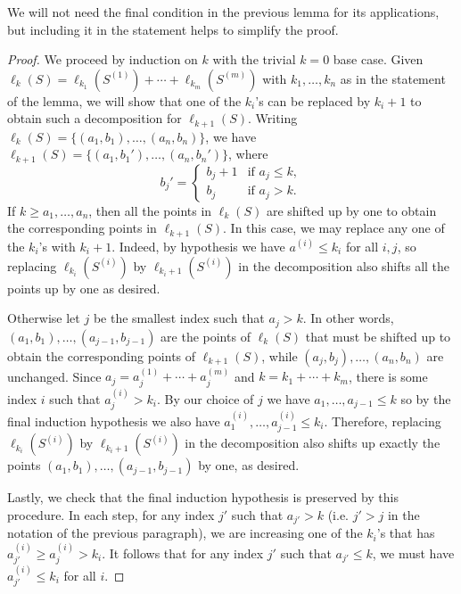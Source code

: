 \documentclass[12pt]{amsart}
\numberwithin{equation}{section}
\theoremstyle{definition}
\begin{document}
We will not need the final condition in the previous lemma for its applications, but including it in the statement helps to simplify the proof. 

\begin{proof}
    We proceed by induction on $k$ with the trivial $k=0$ base case. Given $\ell_k(S) = \ell_{k_1}(S^{(1)})+\cdots+\ell_{k_m}(S^{(m)})$ with $k_1,\dots,k_n$ as in the statement of the lemma, we will show that one of the $k_i$'s can be replaced by $k_i+1$ to obtain such a decomposition for $\ell_{k+1}(S)$. Writing $\ell_k(S) = \{(a_1,b_1),\dots,(a_n,b_n)\}$, we have $\ell_{k+1}(S) = \{(a_1,b_1'),\dots,(a_n,b_n')\}$, where
    \[ b_j' = \begin{cases}
        b_j+1 & \text{if } a_j\leq k,\\
        b_j & \text{if } a_j>k.
    \end{cases} \]
    If $k\geq a_1,\dots,a_n$, then all the points in $\ell_k(S)$ are shifted up by one to obtain the corresponding points in $\ell_{k+1}(S)$. In this case, we may replace any one of the $k_i$'s with $k_i+1$. Indeed, by hypothesis we have $a^{(i)}\leq k_i$ for all $i,j$, so replacing $\ell_{k_i}(S^{(i)})$ by $\ell_{k_i+1}(S^{(i)})$ in the decomposition also shifts all the points up by one as desired.

    Otherwise let $j$ be the smallest index such that $a_j>k$. In other words, $(a_1,b_1),\dots,(a_{j-1},b_{j-1})$ are the points of $\ell_k(S)$ that must be shifted up to obtain the corresponding points of $\ell_{k+1}(S)$, while $(a_j,b_j),\dots,(a_n,b_n)$ are unchanged. Since $a_j = a_j^{(1)}+\cdots+a_j^{(m)}$ and $k = k_1+\cdots+k_m$, there is some index $i$ such that $a_j^{(i)}>k_i$. By our choice of $j$ we have $a_1,\dots,a_{j-1}\leq k$ so by the final induction hypothesis we also have $a_1^{(i)},\dots,a_{j-1}^{(i)}\leq k_i$. Therefore, replacing $\ell_{k_i}(S^{(i)})$ by $\ell_{k_i+1}(S^{(i)})$ in the decomposition also shifts up exactly the points $(a_1,b_1),\dots,(a_{j-1},b_{j-1})$ by one, as desired. 
    
    Lastly, we check that the final induction hypothesis is preserved by this procedure. In each step, for any index $j'$ such that $a_{j'}>k$ (i.e. $j'>j$ in the notation of the previous paragraph), we are increasing one of the $k_i$'s that has $a_{j'}^{(i)}\geq a_{j}^{(i)}>k_i$. It follows that for any index $j'$ such that $a_{j'}\leq k$, we must have $a_{j'}^{(i)}\leq k_i$ for all $i$.
\end{proof}
\end{document}
